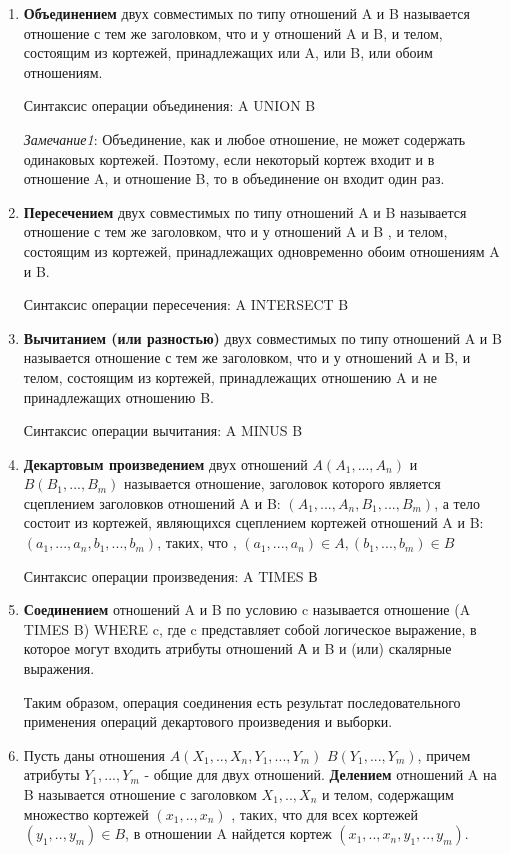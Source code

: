 \begin{enumerate}
    \item   \textbf{Объединением} двух совместимых по типу отношений A и B называется отношение с тем же заголовком, что и у отношений A и B, и телом, состоящим из кортежей, принадлежащих или A, или B, или обоим отношениям.

Синтаксис операции объединения: A UNION B


\textit{Замечание1}: Объединение, как и любое отношение, не может содержать одинаковых кортежей. Поэтому, если некоторый кортеж входит и в отношение A, и отношение B, то в объединение он входит один раз.


\item 
\textbf{Пересечением} двух совместимых по типу отношений A и B называется отношение с тем же заголовком, что и у отношений A и B , и телом, состоящим из кортежей, принадлежащих одновременно обоим отношениям A и B.

Синтаксис операции пересечения: A INTERSECT B

\item  \textbf{Вычитанием (или разностью)} двух совместимых по типу отношений A и B называется отношение с тем же заголовком, что и у отношений A и B, и телом, состоящим из кортежей, принадлежащих отношению A и не принадлежащих отношению B. 

Синтаксис операции вычитания: A MINUS B

\item \textbf{Декартовым произведением} двух отношений $A(A_1, ..., A_n)$ и $B(B_1,..., B_m)$ называется отношение, заголовок которого является сцеплением заголовков отношений A и B: $(A_1, ..., A_n, B_1,..., B_m)$,
а тело состоит из кортежей, являющихся сцеплением кортежей отношений A и B: $(a_1, ..., a_n, b_1,..., b_m)$, таких, что , $(a_1, ..., a_n) \in A, (b_1,..., b_m) \in B$

Синтаксис операции произведения: A TIMES В

\item    \textbf{Соединением} отношений A и B по условию c называется отношение (A TIMES B) WHERE c, где c представляет собой логическое выражение, в которое могут входить атрибуты отношений А и B и (или) скалярные выражения.

Таким образом, операция соединения есть результат последовательного применения операций декартового произведения и выборки. 


\item Пусть даны отношения $A(X_1, .., X_n, Y_1, ..., Y_m)$  $B(Y_1, ..., Y_m)$, причем атрибуты $Y_1, ..., Y_m$ - общие для двух отношений. \textbf{Делением} отношений A на B называется отношение с заголовком  $X_1, .., X_n$ и телом, содержащим множество кортежей $(x_1, .., x_n)$ , таких, что для всех кортежей $(y_1, .., y_m) \in B$, в отношении A найдется кортеж $(x_1, .., x_n, y_1, .., y_m)$.


\end{enumerate}
